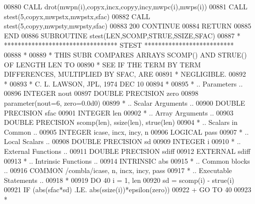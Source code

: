 \begin{DoxyCode}
00880          \textcolor{keyword}{CALL }drot(mwpn(i),copyx,incx,copyy,incy,mwpc(i),mwps(i))
00881          \textcolor{keyword}{CALL }stest(5,copyx,mwpstx,mwpstx,sfac)
00882          \textcolor{keyword}{CALL }stest(5,copyy,mwpsty,mwpsty,sfac)
00883   200 \textcolor{keywordflow}{CONTINUE}
00884       \textcolor{keywordflow}{RETURN}
00885 \textcolor{keyword}{      END}
00886 \textcolor{keyword}{      SUBROUTINE }stest(LEN,SCOMP,STRUE,SSIZE,SFAC)
00887 \textcolor{comment}{*     ********************************* STEST **************************}
00888 \textcolor{comment}{*}
00889 \textcolor{comment}{*     THIS SUBR COMPARES ARRAYS  SCOMP() AND STRUE() OF LENGTH LEN TO}
00890 \textcolor{comment}{*     SEE IF THE TERM BY TERM DIFFERENCES, MULTIPLIED BY SFAC, ARE}
00891 \textcolor{comment}{*     NEGLIGIBLE.}
00892 \textcolor{comment}{*}
00893 \textcolor{comment}{*     C. L. LAWSON, JPL, 1974 DEC 10}
00894 \textcolor{comment}{*}
00895 \textcolor{comment}{*     .. Parameters ..}
00896       \textcolor{keywordtype}{INTEGER}          nout
00897       \textcolor{keywordtype}{DOUBLE PRECISION} zero
00898       parameter(nout=6, zero=0.0d0)
00899 \textcolor{comment}{*     .. Scalar Arguments ..}
00900       \textcolor{keywordtype}{DOUBLE PRECISION} sfac
00901       \textcolor{keywordtype}{INTEGER}          len
00902 \textcolor{comment}{*     .. Array Arguments ..}
00903       \textcolor{keywordtype}{DOUBLE PRECISION} scomp(len), ssize(len), strue(len)
00904 \textcolor{comment}{*     .. Scalars in Common ..}
00905       \textcolor{keywordtype}{INTEGER}          icase, incx, incy, n
00906       \textcolor{keywordtype}{LOGICAL}          pass
00907 \textcolor{comment}{*     .. Local Scalars ..}
00908       \textcolor{keywordtype}{DOUBLE PRECISION} sd
00909       \textcolor{keywordtype}{INTEGER}          i
00910 \textcolor{comment}{*     .. External Functions ..}
00911       \textcolor{keywordtype}{DOUBLE PRECISION} sdiff
00912       \textcolor{keywordtype}{EXTERNAL}         sdiff
00913 \textcolor{comment}{*     .. Intrinsic Functions ..}
00914       \textcolor{keywordtype}{INTRINSIC}        abs
00915 \textcolor{comment}{*     .. Common blocks ..}
00916       \textcolor{keyword}{COMMON}           /combla/icase, n, incx, incy, pass
00917 \textcolor{comment}{*     .. Executable Statements ..}
00918 \textcolor{comment}{*}
00919       \textcolor{keywordflow}{DO} 40 i = 1, len
00920          sd = scomp(i) - strue(i)
00921          \textcolor{keywordflow}{IF} (abs(sfac*sd) .LE. abs(ssize(i))*epsilon(zero))
00922      +       \textcolor{keywordflow}{GO TO} 40
00923 \textcolor{comment}{*}

\end{DoxyCode}
